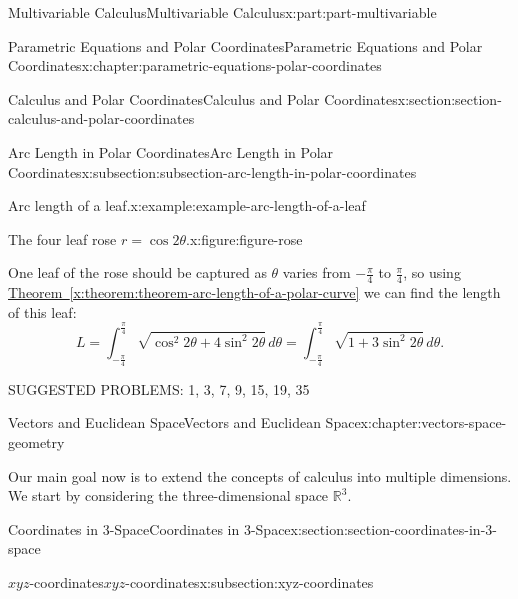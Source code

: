 \documentclass[twoside,10pt,]{tufte-book}
\newcommand{\xreffont}{\relax}
\numberwithin{equation}{part}
\newcommand{\RR}{\mathbb{R}}
\begin{document}
\begin{partptx}{Multivariable Calculus}{}{Multivariable Calculus}{}{}{x:part:part-multivariable}
\begin{chapterptx}{Parametric Equations and Polar Coordinates}{}{Parametric Equations and Polar Coordinates}{}{}{x:chapter:parametric-equations-polar-coordinates}
\begin{sectionptx}{Calculus and Polar Coordinates}{}{Calculus and Polar Coordinates}{}{}{x:section:section-calculus-and-polar-coordinates}
\begin{subsectionptx}{Arc Length in Polar Coordinates}{}{Arc Length in Polar Coordinates}{}{}{x:subsection:subsection-arc-length-in-polar-coordinates}
\begin{example}{Arc length of a leaf.}{x:example:example-arc-length-of-a-leaf}
\begin{figureptx}{The four leaf rose \(r=\cos2\theta\).}{x:figure:figure-rose}{}
\begin{image}{0}{1}{0}
{
}%
\end{image}%
\tcblower
\end{figureptx}%
One leaf of the rose should be captured as \(\theta\) varies from \(-\frac{\pi}{4}\) to \(\frac{\pi}{4}\), so using \hyperref[x:theorem:theorem-arc-length-of-a-polar-curve]{Theorem~{\xreffont\ref{x:theorem:theorem-arc-length-of-a-polar-curve}}} we can find the length of this leaf:%
%
\begin{equation*}
L = \int_{-\frac{\pi}{4}}^{\frac{\pi}{4}}\sqrt{\cos^{2}2\theta + 4\sin^{2}2\theta}\,d\theta = \int_{-\frac{\pi}{4}}^{\frac{\pi}{4}}\sqrt{1 + 3\sin^{2}2\theta}\,d\theta.
\end{equation*}
\end{example}
SUGGESTED PROBLEMS: 1, 3, 7, 9, 15, 19, 35%
\end{subsectionptx}
\end{sectionptx}
\end{chapterptx}
%
\typeout{************************************************}
\typeout{************************************************}
%
\begin{chapterptx}{Vectors and Euclidean Space}{}{Vectors and Euclidean Space}{}{}{x:chapter:vectors-space-geometry}
\begin{introduction}{}%
Our main goal now is to extend the concepts of calculus into multiple dimensions. We start by considering the three-dimensional space \(\RR^{3}\).%
\end{introduction}%
%
%
\typeout{************************************************}
\typeout{************************************************}
%
\begin{sectionptx}{Coordinates in 3-Space}{}{Coordinates in 3-Space}{}{}{x:section:section-coordinates-in-3-space}
%
%
\typeout{************************************************}
\typeout{************************************************}
%
\begin{subsectionptx}{\(xyz\)-coordinates}{}{\(xyz\)-coordinates}{}{}{x:subsection:xyz-coordinates}

\end{subsectionptx}
\end{sectionptx}
\end{chapterptx}
\end{partptx}
\end{document}
